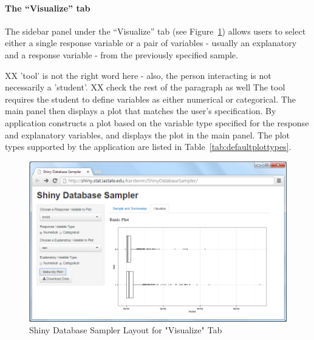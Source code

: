\documentclass{article}\usepackage[]{graphicx}\usepackage[]{color}
\newcommand{\hh}[1]{{\color{ForestGreen} #1}}
\begin{document}
\paragraph{The ``Visualize'' tab} \hfill\newline

The sidebar panel under the ``Visualize'' tab (see Figure~\ref{fig:visualizetab}) allows users to select either a single response variable or a pair of variables - usually an explanatory and a response variable -  from the previously specified sample.

\hh{XX 'tool' is not the right word here - also, the person interacting is not necessarily a 'student'. XX check the rest of the paragraph as well}
The tool requires the student to define variables as either numerical or categorical.  The main panel then displays a plot that matches the user's specification.  By application constructs a plot based on the variable type specified for the response and explanatory variables, and displays the plot in the main panel. The plot types supported by the application are listed in Table~\ref{tab:defaultplottypes}. \\   

\begin{figure}[htbp]
\begin{center}
\includegraphics[keepaspectratio=TRUE,width=.99\textwidth]{figure/Visualize.png}
\end{center}
\caption{Shiny Database Sampler Layout for "Visualize" Tab} 
\label{fig:visualizetab}
\end{figure}
\end{document}
